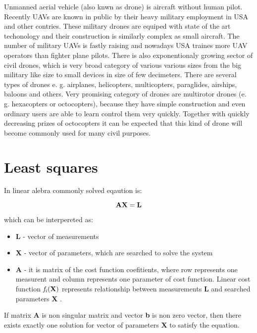 \documentclass[a4paper,12pt]{report}
\newcommand{\ematr}[1]{
{\bf #1}
}
\newcommand{\evect}[1]{
{\bf #1}
}
\newcommand{\efunc}[1]{
{\it #1}
}
\begin{document}
Unmanned aerial vehicle (also knwn as drone) is aircraft without human pilot. Recently UAVs are known in public by
their heavy military employment in USA and other contries. These military drones are equiped with state of the art 
techonology and their construction is similarly complex as small aircraft.
The number of military UAVs is fastly raising and nowadays USA traines more UAV operators than fighter plane pilots. 
There is also exponentionaly growing sector of civil drones, which is very broad category of various various sizes 
from the big military like size to small devices in size of few decimeters. There are several types of drones e. g. airplanes,
helicopters, multicopters, paraglides, airships, baloons and others. 
Very promising category of drones are multirotor drones (e. g. hexacopters or octocopters), because they have simple construction and 
even ordinary users are able to learn control them very quickly. Together with quickly decreasing prizes of octocopters it can be expected 
that this kind of drone will become commonly used for many civil purposes. 

\section{Least squares}
\label{sec:least}


In linear alebra commonly solved eqaution is:

\begin{equation}
\label{eq:linear_eq}
\ematr{A}\evect{X} = \evect{L} 
\end{equation} 

which can be interpereted as:
\begin{itemize}
\item \evect{L} - vector of measurements
\item \evect{X} - vector of parameters, which are searched to solve the system
\item \ematr{A} - it is matrix of the cost function  coefitients,  where row represents one measurent 
		  and column represents one parameter of cost function. Linear cost function $\efunc{f_{i}(\evect{X})}$
		  represents relationship between measurements \evect{L} and searched parameters \evect{X}. 
\end{itemize}



If matrix \ematr{A} is 
non singular matrix and vector \evect{b} is non zero vector, then there exists exactly one solution 
for vector of parameters  \evect{X} to satisfy the equation. 
\end{document}
